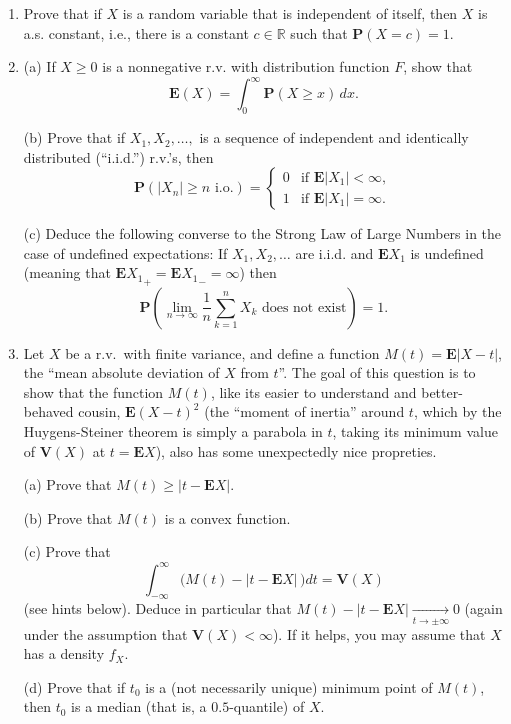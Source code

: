 \documentclass[12pt]{article}
\newcommand{\R}{\mathbb{R}}
\newcommand{\prob}{\mathbf{P}}
\newcommand{\expec}{\mathbf{E}}
\newcommand{\var}{\mathbf{V}}
\theoremstyle{example}
\begin{document}
\begin{enumerate}
\item Prove that if $X$ is a random variable that is independent of itself, then $X$ is a.s. constant, i.e., there is a constant $c\in\R$ such that $\prob(X=c)=1$.





\item (a) If $X\ge 0$ is a nonnegative r.v. with distribution function $F$, show that $$\expec(X)=\int_0^\infty \prob(X\ge x)\,dx.$$

\medskip \noindent
(b) Prove that if $X_1, X_2, \ldots, $ is a sequence of independent and identically distributed (``i.i.d.'') r.v.'s, then
$$\prob(|X_n|\ge n\textrm{ i.o.})=\begin{cases} 0 & \textrm{if }\expec|X_1|<\infty, \\ 
1 & \textrm{if }\expec|X_1|=\infty. \end{cases}$$

\medskip \noindent
(c) Deduce the following converse to the Strong Law of Large Numbers in the case of undefined expectations:
If $X_1,X_2,\ldots$ are i.i.d. and $\expec X_1$ is undefined (meaning that $\expec {X_1}_+ = \expec {X_1}_- = \infty$) then
$$ \prob\left( \lim_{n\to\infty} \frac{1}{n}\sum_{k=1}^n X_k\textrm{ does not exist} \right) = 1. $$


\item Let $X$ be a r.v.\ with finite variance, and define a function $M(t)=\expec|X-t|$, the ``mean absolute deviation of $X$ from $t$''. The goal of this question is to show that the function $M(t)$, like its easier to understand and better-behaved cousin, $\expec(X-t)^2$ (the ``moment of inertia'' around $t$, which by the Huygens-Steiner theorem is simply a parabola in $t$, taking its minimum value of $\var(X)$ at $t=\expec X$), also has some unexpectedly nice propreties.

\medskip\noindent
(a) Prove that $M(t) \ge |t- \expec X|$.

\medskip\noindent
(b) Prove that $M(t)$ is a convex function.

\medskip\noindent
(c) Prove that
$$ \int_{-\infty}^\infty \Big( M(t)-|t-\expec X|\, \Big)  dt =  \var(X) $$
(see hints below).
Deduce in particular that $M(t)-|t-\expec X|\xrightarrow[t\to\pm \infty]{} 0$ (again under the assumption that $\var(X)<\infty$). If it helps, you may assume that $X$ has a density $f_X$.

\medskip\noindent
(d) Prove that if $t_0$ is a (not necessarily unique) minimum point of $M(t)$, then $t_0$ is a median (that is, a $0.5$-quantile) of $X$.


\end{enumerate}
\end{document}
